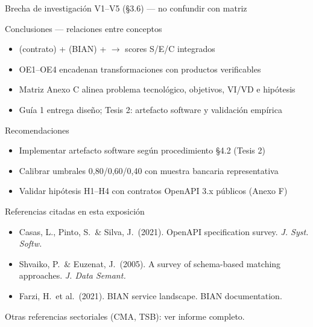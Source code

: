 \documentclass[aspectratio=169,11pt,spanish]{beamer}
\begin{document}
\begin{frame}{Brecha de investigación V1--V5 (§3.6) --- no confundir con matriz}
\end{frame}

\begin{frame}{Conclusiones --- relaciones entre conceptos}
  \begin{planpanel}
  \begin{itemize}
    \item {} (contrato) +  (BIAN) +  $\rightarrow$ scores S/E/C integrados
    \item OE1--OE4 encadenan transformaciones con productos verificables
    \item Matriz Anexo C alinea problema tecnológico, objetivos, VI/VD e hipótesis
    \item Guía 1 entrega diseño; Tesis 2: artefacto software y validación empírica
  \end{itemize}
  \end{planpanel}
\end{frame}

\begin{frame}{Recomendaciones}
  \begin{planpanel}
  \begin{itemize}
    \item Implementar artefacto software según procedimiento §4.2 (Tesis 2)
    \item Calibrar umbrales 0{,}80/0{,}60/0{,}40 con muestra bancaria representativa
    \item Validar hipótesis H1--H4 con contratos OpenAPI 3.x públicos (Anexo F)
  \end{itemize}
  \end{planpanel}
\end{frame}

\begin{frame}{Referencias citadas en esta exposición}
  \begin{planpanel}
  \begin{itemize}
    \item Casas, L., Pinto, S.\ \& Silva, J.\ (2021). OpenAPI specification survey. \textit{J. Syst. Softw.}
    \item Shvaiko, P.\ \& Euzenat, J.\ (2005). A survey of schema-based matching approaches. \textit{J. Data Semant.}
    \item Farzi, H.\ et al.\ (2021). BIAN service landscape. BIAN documentation.
  \end{itemize}
  \end{planpanel}
  \vspace{0.35em}
  {\large Otras referencias sectoriales (CMA, TSB): ver informe completo.}
\end{frame}
\end{document}
